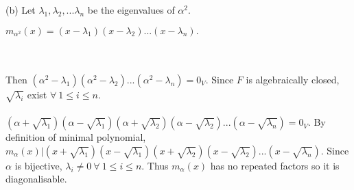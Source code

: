 \documentclass{article}
\begin{document}
(b) Let $\lambda_1,\lambda_2,...\lambda_n$ be the eigenvalues of $\alpha^2$.\begin{center}
 $m_{\alpha^2}(x) = (x-\lambda_1)(x-\lambda_2)...(x-\lambda_n).$\end{center}\\\\
Then $(\alpha^2 - \lambda_1)(\alpha^2 - \lambda_2)...(\alpha^2 - \lambda_n) = 0_V$. Since $F$ is algebraically closed, $\sqrt{\lambda_i}$ exist $\forall \ 1\leq i \leq n$.\\\\
$(\alpha+\sqrt{\lambda_1})(\alpha-\sqrt{\lambda_1})(\alpha+\sqrt{\lambda_2})(\alpha-\sqrt{\lambda_2})...(\alpha-\sqrt{\lambda_n}) = 0_V.$ By definition of minimal polynomial, $m_\alpha(x)|(x+\sqrt{\lambda_1})(x-\sqrt{\lambda_1})(x+\sqrt{\lambda_2})(x-\sqrt{\lambda_2})...(x-\sqrt{\lambda_n})$. Since $\alpha$ is bijective, $\lambda_i \neq 0\ \forall \ 1\leq i\leq n$. Thus $m_\alpha(x)$ has no repeated factors so it is diagonalisable. \\\\
\end{document}
